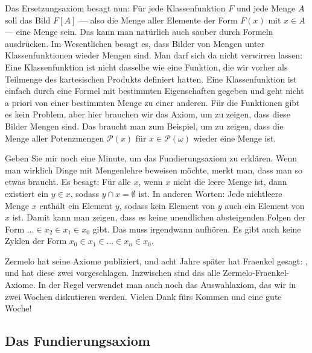\begin{spoken-clean}[01:21:39 - 01:24:03]
Das Ersetzungsaxiom besagt nun: Für jede Klassenfunktion $F$ und jede Menge $A$ soll das Bild $F[A]$ --- also die Menge aller Elemente der Form $F(x)$ mit $x \in A$ --- eine Menge sein. Das kann man natürlich auch sauber durch Formeln ausdrücken. Im Wesentlichen besagt es, dass Bilder von Mengen unter Klassenfunktionen wieder Mengen sind. Man darf sich da nicht verwirren lassen: Eine Klassenfunktion ist nicht dasselbe wie eine Funktion, die wir vorher als Teilmenge des kartesischen Produkts definiert hatten. Eine Klassenfunktion ist einfach durch eine Formel mit bestimmten Eigenschaften gegeben und geht nicht a priori von einer bestimmten Menge zu einer anderen. Für die  Funktionen gibt es kein Problem, aber hier brauchen wir das Axiom, um zu zeigen, dass diese Bilder Mengen sind. Das braucht man zum Beispiel, um zu zeigen, dass die Menge aller Potenzmengen $\mathcal{P}(x)$ für $x \in \mathcal{P}(\omega)$ wieder eine Menge ist.

Geben Sie mir noch eine Minute, um das Fundierungsaxiom zu erklären. Wenn man wirklich Dinge mit Mengenlehre beweisen möchte, merkt man, dass man so etwas braucht. Es besagt: Für alle $x$, wenn $x$ nicht die leere Menge ist, dann existiert ein $y \in x$, sodass $y \cap x = \emptyset$ ist. In anderen Worten: Jede nichtleere Menge $x$ enthält ein Element $y$, sodass kein Element von $y$ auch ein Element von $x$ ist. Damit kann man zeigen, dass es keine unendlichen absteigenden Folgen der Form $\dots \in x_2 \in x_1 \in x_0$ gibt. Das muss irgendwann aufhören. Es gibt auch keine Zyklen der Form $x_0 \in x_1 \in \dots \in x_n \in x_0$.

Zermelo hat seine Axiome publiziert, und acht Jahre später hat Fraenkel gesagt: , und hat diese zwei vorgeschlagen. Inzwischen sind das alle Zermelo-Fraenkel-Axiome. In der Regel verwendet man auch noch das Auswahlaxiom, das wir in zwei Wochen diskutieren werden. Vielen Dank fürs Kommen und eine gute Woche!
\end{spoken-clean}

\subsection{Das Fundierungsaxiom}

